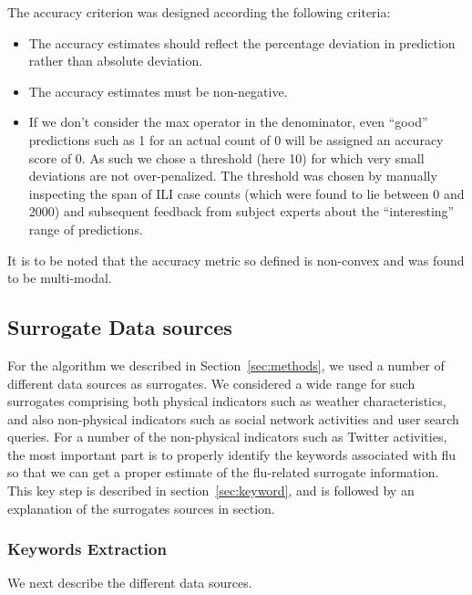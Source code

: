 The accuracy criterion was designed according the following criteria:
\begin{itemize} 
    \item 
    The accuracy estimates should reflect the percentage
    deviation in prediction rather than absolute deviation. 
\item The accuracy estimates must be non-negative.  \item If we
don't consider the max operator in the denominator, even ``good'' predictions
such as 1 for an actual count of 0 will be assigned an accuracy score of 0. As
such we chose a threshold (here 10) for which very small deviations are not
over-penalized. The threshold was chosen by manually inspecting the span of ILI
case counts (which were found to lie between 0 and 2000) and subsequent
feedback from subject experts about the ``interesting'' range of predictions.
\end{itemize} 
It is to be noted that the accuracy metric so defined is
non-convex and was found to be multi-modal. 


\subsection{Surrogate Data sources}
For the algorithm we described in Section~\ref{sec:methods},
we used a number of different data sources as
surrogates. We considered a wide range for such surrogates comprising both
physical indicators such as weather characteristics, and also non-physical
indicators such as social network activities and user search queries.  For a
number of the non-physical indicators such as Twitter activities, the most
important part is to properly identify the keywords associated with flu so that
we can get a proper estimate of the flu-related surrogate information. This key
step is described in section~\ref{sec:keyword}, and is followed by an
explanation of the surrogates sources in section. 

\subsubsection{\label{sec:keyword} Keywords Extraction} 

We next describe the different data sources.

